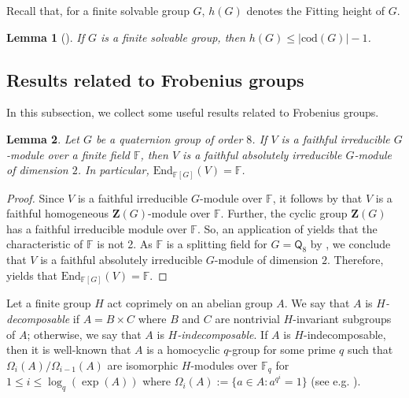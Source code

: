 \documentclass[9pt]{article}
\newtheorem{lem}{\bf Lemma}[section]
\begin{document}
Recall that, for a finite solvable group $G$,
$h(G)$ denotes the Fitting height of $G$.


\begin{lem}[\mbox{\cite[Corollary 1.2]{qian2025}}]\label{lem: qz}
	If $G$ is a finite solvable group,
	then $h(G)\leq |\mathrm{cod}(G)|-1$.
\end{lem}







\subsection{Results related to Frobenius groups}

In this subsection, we collect some useful results related to Frobenius groups.


\begin{lem}\label{lem: faith irred mod of Q8}
	Let $G$ be a quaternion group of order $8$.
	If $V$ is a faithful irreducible $G$-module over a finite field $\mathbb{F}$,
    then $V$ is a faithful absolutely irreducible $G$-module of dimension $2$.
	In particular, $\mathrm{End}_{\mathbb{F}[G]}(V)=\mathbb{F}$.	
\end{lem}
\begin{proof}
	Since $V$ is a faithful irreducible $G$-module over $\mathbb{F}$, 
	it follows by \cite[Chapter B, Corollary 9.4]{doerk1992}
	that $V$ is a faithful homogeneous $\mathbf{Z}(G)$-module over $\mathbb{F}$.
    Further, the cyclic group $\mathbf{Z}(G)$ has a faithful irreducible module over $\mathbb{F}$.
	So, an application of \cite[Chapter B, Theorem 9.8]{doerk1992} yields that 
	 the characteristic of $\mathbb{F}$ is not 2.
    As $\mathbb{F}$ is a splitting field for $G=\mathsf{Q}_8$ by \cite[Theorem 2.6]{huppertbook2},
	we conclude that $V$ is a faithful absolutely irreducible $G$-module of dimension $2$.
	Therefore, \cite[Kapitel V, 11.10 Hilfssatz]{huppertgrouptheory}
	yields that $\mathrm{End}_{\mathbb{F}[G]}(V)=\mathbb{F}$.	
\end{proof}

Let a finite group $H$ act coprimely on an abelian group $A$.
We say that $A$ is \emph{$H$-decomposable} if $A=B\times C$ where $B$ and $C$ 
are nontrivial $H$-invariant subgroups of $A$;
otherwise, we say that $A$ is \emph{$H$-indecomposable}.
If $A$ is $H$-indecomposable, then it is well-known that
$A$ is a homocyclic $q$-group for some prime $q$ such that
$\Omega_{i}(A)/\Omega_{i-1}(A)$
are isomorphic $H$-modules over $\mathbb{F}_q$ for $1\leq i\leq \log_q(\exp(A))$
where $\Omega_i(A):=\{ a\in A: a^{q^i}=1 \}$
(see e.g. \cite[Corollary 1]{harris1977}).
\end{document}

